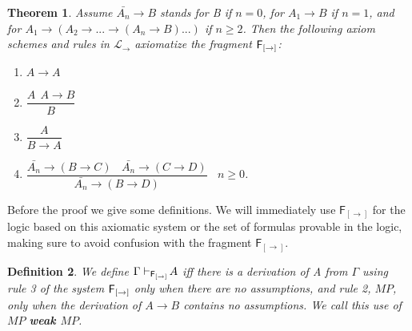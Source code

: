 \documentclass[12pt]{article}
\newtheorem{thm}{Theorem}[section]
\newtheorem{dfn}[thm]{Definition}
\begin{document}
\begin{thm}\label{CFrr}
Assume $ \bar{A_{n}}\rightarrow B $ stands for B if  $ n=0 $, for $ A_{1}\rightarrow B $ if $ n=1 $, and for $A_{1}\rightarrow (A_{2}\rightarrow  ... \rightarrow (A_{n}\rightarrow B) ... )  $ if $ n\geq 2 $. Then the following  axiom schemes and rules in $ \mathcal{L} _{\rightarrow} $ axiomatize the fragment $ {\sf F_{[\rightarrow]}}  $:
\begin{enumerate}
\item $A\rightarrow A$
\item $ \dfrac{A ~~A\rightarrow B}{B}$
\item $  \dfrac{A}{B\rightarrow A} $
\item $ \dfrac{\bar{A_{n}}\rightarrow (B\rightarrow C)~~~~\bar{A_{n}}\rightarrow (C\rightarrow D)}{\bar{A_{n}}\rightarrow (B\rightarrow D)} ~~~~n\geq 0$.
\end{enumerate}
\end{thm}
  Before the proof we give some definitions. We will immediately use $ \mathsf{ F_{[\rightarrow]}}  $ for the logic based on this axiomatic system or the set of formulas provable in the logic, making sure to avoid confusion with the fragment $ \mathsf{ F_{[\rightarrow]}}  $. 

\begin{dfn}

We define $\Gamma\vdash_{{\sf F_{[\rightarrow]}} }\!A$ iff there is a  derivation of A from $ \Gamma $ using rule 3 of the system $ {\sf F_{[\rightarrow]}}  $ only when there are no assumptions, and rule 2, $M\!P$, only when the derivation of $ A\rightarrow B $ contains no assumptions. We call this use of $M\!P$ \textbf{weak $M\!P$}.
\end{dfn}
\end{document}
